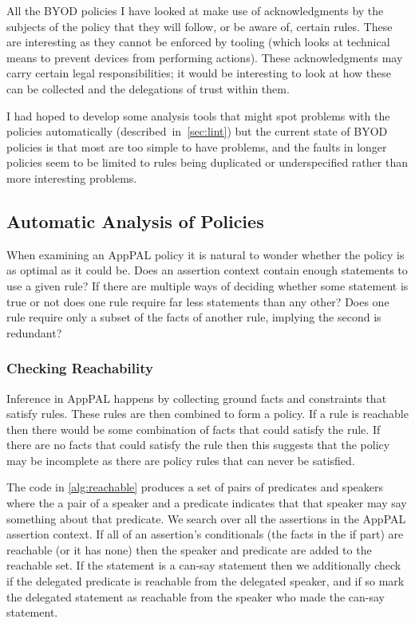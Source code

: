 \documentclass[a4paper]{scrartcl}
\begin{document}
All the BYOD policies I have looked at make use of acknowledgments by the
subjects of the policy that they will follow, or be aware of, certain rules.
These are interesting as they cannot be enforced by tooling (which
looks at technical means to prevent devices from performing actions).  These
acknowledgments may carry certain legal responsibilities; it would be
interesting to look at how these can be collected and the delegations of trust
within them.

I had hoped to develop some analysis tools that might spot problems with the
policies automatically (described~in~\autoref{sec:lint}) but the current state
of BYOD policies is that most are too simple to have problems, and the faults in
longer policies seem to be limited to rules being duplicated or underspecified
rather than more interesting problems.  

\subsection{Automatic Analysis of Policies}
\label{sec:lint}

When examining an AppPAL policy it is natural to wonder whether the policy is as
optimal as it could be.  Does an assertion context contain enough statements to
use a given rule?  If there are multiple ways of deciding whether some statement
is true or not does one rule require far less statements than any other?  Does
one rule require only a subset of the facts of another rule, implying the second
is redundant?

\subsubsection{Checking Reachability}

Inference in AppPAL happens by collecting ground facts and constraints that
satisfy rules. These rules are then combined to form a policy. If a rule is
reachable then there would be some combination of facts that could satisfy the
rule. If there are no facts that could satisfy the rule then this suggests that
the policy may be incomplete as there are policy rules that can never be
satisfied.

The code in \autoref{alg:reachable} produces a set of pairs of predicates and
speakers where the a pair of a speaker and a predicate indicates that that
speaker may say something about that predicate. We search over all the
assertions in the AppPAL assertion context. If all of an assertion's
conditionals (the facts in the if part) are reachable (or it has none) then the
speaker and predicate are added to the reachable set. If the statement is a
can-say statement then we additionally check if the delegated predicate is
reachable from the delegated speaker, and if so mark the delegated statement as
reachable from the speaker who made the can-say statement.
\end{document}
